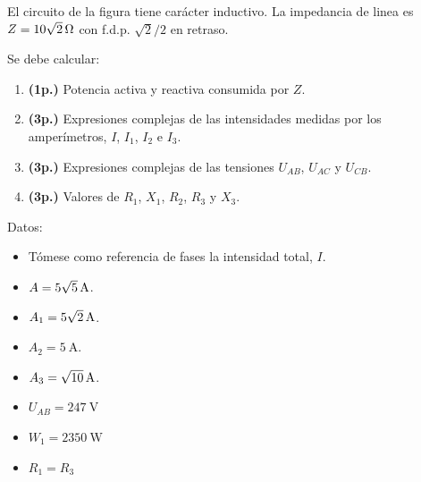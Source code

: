 \documentclass[12pt]{article}
\begin{document}
\begin{enumerate}






El circuito de la figura tiene carácter inductivo.  La impedancia de
linea es $Z=\SI[parse-numbers=false]{10\sqrt{2}}{\ohm}$ con
f.d.p. $\sqrt{2}/2$ en retraso. 

Se debe calcular:

\begin{enumerate}

\item \textbf{(1p.)} Potencia activa y reactiva consumida por $Z$.

\item  \textbf{(3p.)} Expresiones complejas de las intensidades medidas por los
  amperímetros, $I$, $I_1$, $I_2$ e $I_3$. 

\item  \textbf{(3p.)} Expresiones complejas de las tensiones $U_{AB}$, $U_{AC}$ y
  $U_{CB}$.

\item  \textbf{(3p.)} Valores de $R_1$, $X_1$, $R_2$, $R_3$ y $X_3$.

\end{enumerate}

Datos:
\begin{itemize}

\item Tómese como referencia de fases la intensidad total, $I$.
\item $A = \SI[parse-numbers = false]{5\sqrt{5}}{\ampere}$.
\item $A_1 = \SI[parse-numbers = false]{5\sqrt{2}}{\ampere}$.
\item $A_2 = \SI{5}{\ampere}$.
\item $A_3 = \SI[parse-numbers = false]{\sqrt{10}}{\ampere}$.
\item $U_{AB} = \SI{247}{\volt}$
\item $W_1 = \SI{2350}{\watt}$
\item $R_1 = R_3$


\end{itemize}
\end{enumerate}
\end{document}
